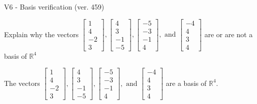 \begin{exercise}
  \begin{exerciseTitle}V6 - Basis verification (ver. 459)\end{exerciseTitle}
  \begin{exerciseStatement}
    Explain why the vectors \(\left[\begin{array}{r}
1 \\
4 \\
-2 \\
3
\end{array}\right] , \left[\begin{array}{r}
4 \\
3 \\
-1 \\
-5
\end{array}\right] , \left[\begin{array}{r}
-5 \\
-3 \\
-1 \\
4
\end{array}\right] , \text{ and } \left[\begin{array}{r}
-4 \\
4 \\
3 \\
4
\end{array}\right]\) are or are not a basis of \(\mathbb{R}^4\)	


  \end{exerciseStatement}
  \begin{exerciseAnswer}
   The vectors \(\left[\begin{array}{r}
1 \\
4 \\
-2 \\
3
\end{array}\right] , \left[\begin{array}{r}
4 \\
3 \\
-1 \\
-5
\end{array}\right] , \left[\begin{array}{r}
-5 \\
-3 \\
-1 \\
4
\end{array}\right] , \text{ and } \left[\begin{array}{r}
-4 \\
4 \\
3 \\
4
\end{array}\right]\) 
  	 are  a basis of \(\mathbb{R}^4\).
  


  \end{exerciseAnswer}
\end{exercise}